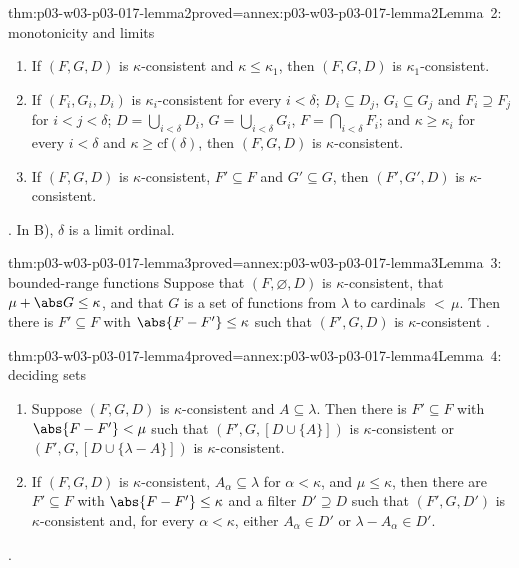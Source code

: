 \begin{hblemma}{thm:p03-w03-p03-017-lemma2}{proved=annex:p03-w03-p03-017-lemma2}{Lemma~2: monotonicity and limits}
\begin{enumerate}
  \item[A)] If \((F,G,D)\) is \(\kappa\)-consistent and
        \(\kappa\le\kappa_1\), then \((F,G,D)\) is
        \(\kappa_1\)-consistent.
  \item[B)] If \((F_i,G_i,D_i)\) is \(\kappa_i\)-consistent for every
        \(i<\delta\); \(D_i\subseteq D_j\), \(G_i\subseteq G_j\) and
        \(F_i\supseteq F_j\) for \(i<j<\delta\); \(D=\bigcup_{i<\delta}D_i\),
        \(G=\bigcup_{i<\delta}G_i\), \(F=\bigcap_{i<\delta}F_i\); and
        \(\kappa\ge\kappa_i\) for every \(i<\delta\) and
        \(\kappa\ge\mathrm{cf}(\delta)\), then \((F,G,D)\) is
        \(\kappa\)-consistent.
  \item[C)] If \((F,G,D)\) is \(\kappa\)-consistent, \(F'\subseteq F\) and
        \(G'\subseteq G\), then \((F',G',D)\) is \(\kappa\)-consistent.
\end{enumerate}
\cite[pp.~226--227, Lemma~2]{Shelah1971Ultrapowers}.  In B), \(\delta\) is a
limit ordinal.
\end{hblemma}

\begin{hblemma}{thm:p03-w03-p03-017-lemma3}{proved=annex:p03-w03-p03-017-lemma3}{Lemma~3: bounded-range functions}
Suppose that \((F,\varnothing,D)\) is \(\kappa\)-consistent, that
\(\mu+\abs G\le\kappa\), and that \(G\) is a set of functions from \(\lambda\) to cardinals \({<}\,\mu\).
Then there is \(F'\subseteq F\) with \(\abs{F-F'}\le\kappa\) such that
\((F',G,D)\) is \(\kappa\)-consistent
\cite[p.~227, Lemma~3]{Shelah1971Ultrapowers}.
\end{hblemma}

\begin{hblemma}{thm:p03-w03-p03-017-lemma4}{proved=annex:p03-w03-p03-017-lemma4}{Lemma~4: deciding sets}
\begin{enumerate}
  \item[A)] Suppose \((F,G,D)\) is \(\kappa\)-consistent and
        \(A\subseteq\lambda\).  Then there is \(F'\subseteq F\) with
        \(\abs{F-F'}<\mu\) such that \((F',G,[D\cup\{A\}])\) is
        \(\kappa\)-consistent or \((F',G,[D\cup\{\lambda-A\}])\) is
        \(\kappa\)-consistent.
  \item[B)] If \((F,G,D)\) is \(\kappa\)-consistent, \(A_\alpha\subseteq\lambda\)
        for \(\alpha<\kappa\), and \(\mu\le\kappa\), then there are
        \(F'\subseteq F\) with \(\abs{F-F'}\le\kappa\) and a filter
        \(D'\supseteq D\) such that \((F',G,D')\) is \(\kappa\)-consistent
        and, for every \(\alpha<\kappa\), either \(A_\alpha\in D'\) or
        \(\lambda-A_\alpha\in D'\).
\end{enumerate}
\cite[p.~228, Lemma~4]{Shelah1971Ultrapowers}.
\end{hblemma}

